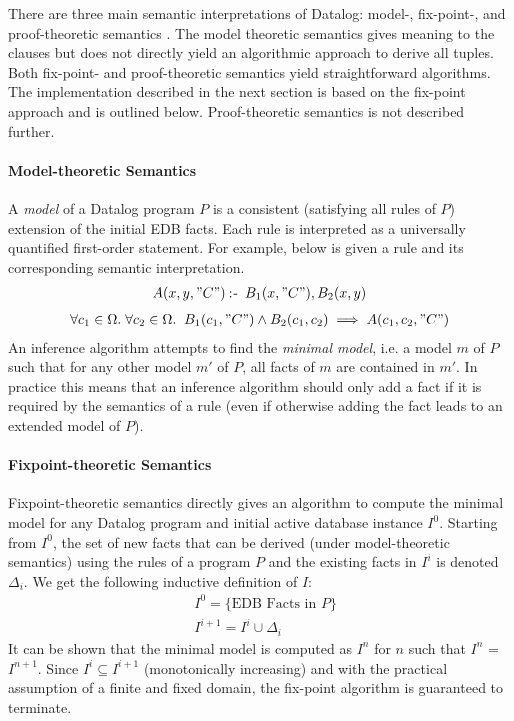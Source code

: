 There are three main semantic interpretations of Datalog: model-, fix-point-, and proof-theoretic semantics \cite{Green:2013:DRQ:2688167.2688168}. The model theoretic semantics gives meaning to the clauses but does not directly yield an algorithmic approach to derive all tuples. Both fix-point- and proof-theoretic semantics yield straightforward algorithms. The implementation described in the next section is based on the fix-point approach and is outlined below. Proof-theoretic semantics is not described further.

\paragraph{Model-theoretic Semantics}\NL
A \textit{model} of a Datalog program $P$ is a consistent (satisfying all rules of $P$) extension of the initial EDB facts. Each rule is interpreted as a universally quantified first-order statement. For example, below is given a rule and its corresponding semantic interpretation. 
\begin{align*}
A(x, y, "C") \mathbin{:\hspace{-0.5ex}\textsf{-}} \;B_1(x, "C"), B_2(x, y)
\end{align*}
\vspace*{-20pt}
\begin{align*}
\forall c_1 \in \Omega.\;\forall c_2 \in \Omega.\;\; B_1(c_1, "C") \land B_2(c_1,c_2) \implies  A(c_1, c_2, "C")
\end{align*}
\noindent
An inference algorithm attempts to find the \textit{minimal model}, i.e. a model $m$ of $P$ such that for any other model $m'$ of $P$, all facts of $m$ are contained in $m'$. In practice this means that an inference algorithm should only add a fact if it is required by the semantics of a rule (even if otherwise adding the fact leads to an extended model of $P$). 

\paragraph{Fixpoint-theoretic Semantics}\NL
Fixpoint-theoretic semantics directly gives an algorithm to compute the minimal model for any Datalog program and initial active database instance $I^0$. Starting from $I^0$, the set of new facts that can be derived (under model-theoretic semantics) using the rules of a program $P$ and the existing facts in $I^i$ is denoted $\Delta_i$. We get the following inductive definition of $I$:
\begin{align*}
&I^0 = \{ \text{EDB Facts in } P \}\\
&I^{i + 1} = I^i \cup \Delta_i 
\end{align*}
\noindent
It can be shown\cite{Green:2013:DRQ:2688167.2688168} that the minimal model is computed as $I^{n}$ for $n$ such that $I^{n}$ = $I^{n + 1}$. Since $I^i \subseteq I^{i + 1}$ (monotonically increasing) and with the practical assumption of a finite and fixed domain, the fix-point algorithm is guaranteed to terminate. 

